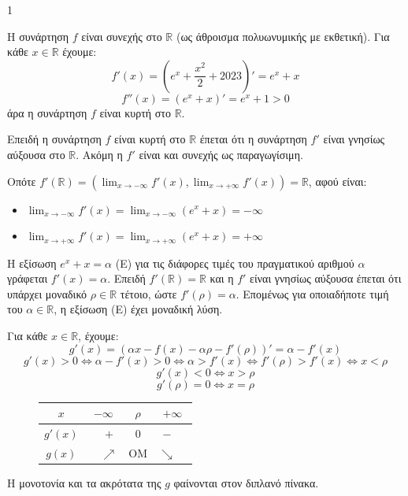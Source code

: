 \begin{ylh}{1}
    \item [Συναρτήσεις]
\end{ylh}

\Askhseis{\alpha)}
\begin{rlist}
    \item Η συνάρτηση $f$ είναι συνεχής στο $\mathbb{R}$ (ως άθροισμα πολυωνυμικής με εκθετική). Για κάθε $x \in \mathbb{R}$ έχουμε:
    \[ f'(x) = \left(e^x + \frac{x^2}{2} + 2023\right)' = e^x + x \]
    \[ f''(x) = (e^x + x)' = e^x + 1 > 0 \]
    άρα η συνάρτηση $f$ είναι κυρτή στο $\mathbb{R}$.
    \item Επειδή η συνάρτηση $f$ είναι κυρτή στο $\mathbb{R}$ έπεται ότι η συνάρτηση $f'$ είναι γνησίως αύξουσα στο $\mathbb{R}$. Ακόμη η $f'$ είναι και συνεχής ως παραγωγίσιμη.

    Οπότε $f'(\mathbb{R}) = \left(\lim_{x \to -\infty} f'(x), \lim_{x \to +\infty} f'(x)\right) = \mathbb{R}$, αφού είναι:
    \begin{itemize}
        \item $\lim_{x \to -\infty} f'(x) = \lim_{x \to -\infty} (e^x + x) = -\infty$
        \item $\lim_{x \to +\infty} f'(x) = \lim_{x \to +\infty} (e^x + x) = +\infty$
    \end{itemize}
\end{rlist}

\Askhseis{\beta)} Η εξίσωση $e^x + x = \alpha$ (Ε) για τις διάφορες τιμές του πραγματικού αριθμού $\alpha$ γράφεται $f'(x) = \alpha$. Επειδή $f'(\mathbb{R}) = \mathbb{R}$ και η $f'$ είναι γνησίως αύξουσα έπεται ότι υπάρχει μοναδικό $\rho \in \mathbb{R}$ τέτοιο, ώστε $f'(\rho) = \alpha$. Επομένως για οποιαδήποτε τιμή του $\alpha \in \mathbb{R}$, η εξίσωση (Ε) έχει μοναδική λύση.

\Askhseis{\gamma)} Για κάθε $x \in \mathbb{R}$, έχουμε:
\[ g'(x) = (\alpha x - f(x) - \alpha \rho - f'(\rho))' = \alpha - f'(x) \]
\[ g'(x) > 0 \Leftrightarrow \alpha - f'(x) > 0 \Leftrightarrow \alpha > f'(x) \Leftrightarrow f'(\rho) > f'(x) \Leftrightarrow x < \rho \]
\[ g'(x) < 0 \Leftrightarrow x > \rho \]
\[ g'(\rho) = 0 \Leftrightarrow x = \rho \]

\begin{figure}
    \begin{tabular}{|c|c|c|c|c|c|} \hline
        $x$ & \multicolumn{2}{c|}{$-\infty$} & $\rho$ & \multicolumn{2}{c|}{$+\infty$} \\ \hline
        $g'(x)$ & & {\color{maincolor} $+$} & $0$ & {\color{maincolor} $-$} & \\ \hline
        $g(x)$ & & {\color{maincolor} $\nearrow$} & OM & {\color{maincolor} $\searrow$} & \\ \hline
    \end{tabular}
\end{figure}
Η μονοτονία και τα ακρότατα της $g$ φαίνονται στον διπλανό πίνακα.

